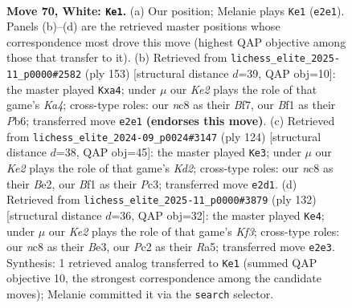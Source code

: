 \documentclass[11pt]{article}
\begin{document}
\clearpage

\begin{figure}[p]\centering
\begin{subfigure}{0.46\textwidth}\centering
\resizebox{\linewidth}{!}{%
\newchessgame
\chessboard[
  setfen={R1nk4/5r1p/P7/2P5/8/2p4P/2P1K1P1/5B2 w - - 3 70},
  showmover=false,
  pgfstyle=straightmove, color=movearrow, markmove={e2-e1}
]}
\caption{}
\end{subfigure}\hfill
\begin{subfigure}{0.46\textwidth}\centering
\resizebox{\linewidth}{!}{%
\newchessgame
\chessboard[
  setfen={8/4Rb2/1p5p/k7/P2K4/1p1N4/7r/8 b - - 1 77},
  showmover=false,
  pgfstyle=straightmove, color=movearrow, markmove={a5-a4}
]}
\caption{}
\end{subfigure}
\\[4pt]
\begin{subfigure}{0.46\textwidth}\centering
\resizebox{\linewidth}{!}{%
\newchessgame
\chessboard[
  setfen={2R5/8/3p3k/1n2p3/1P2P3/2P2P2/3KB1r1/8 w - - 5 63},
  showmover=false,
  pgfstyle=straightmove, color=movearrow, markmove={d2-e3}
]}
\caption{}
\end{subfigure}\hfill
\begin{subfigure}{0.46\textwidth}\centering
\resizebox{\linewidth}{!}{%
\newchessgame
\chessboard[
  setfen={8/3n3p/4kP2/R5P1/8/pr2BK1P/8/8 w - - 3 67},
  showmover=false,
  pgfstyle=straightmove, color=movearrow, markmove={f3-e4}
]}
\caption{}
\end{subfigure}
\caption{\textbf{Move 70, White: \texttt{Ke1}.} (a) Our position; Melanie plays \texttt{Ke1} (\texttt{e2e1}). Panels (b)--(d) are the retrieved master positions whose correspondence most drove this move (highest QAP objective among those that transfer to it). (b) Retrieved from \texttt{lichess\_elite\_2025-11\_p0000\#2582} (ply 153) [structural distance $d$=39, QAP obj=10]: the master played \texttt{Kxa4}; under $\mu$ our \emph{Ke2} plays the role of that game's \emph{Ka4}; cross-type roles: our \emph{n}c8 as their \emph{B}f7, our \emph{B}f1 as their \emph{P}b6; transferred move \texttt{e2e1} \textbf{(endorses this move)}. (c) Retrieved from \texttt{lichess\_elite\_2024-09\_p0024\#3147} (ply 124) [structural distance $d$=38, QAP obj=45]: the master played \texttt{Ke3}; under $\mu$ our \emph{Ke2} plays the role of that game's \emph{Kd2}; cross-type roles: our \emph{n}c8 as their \emph{B}e2, our \emph{B}f1 as their \emph{P}c3; transferred move \texttt{e2d1}. (d) Retrieved from \texttt{lichess\_elite\_2025-11\_p0000\#3879} (ply 132) [structural distance $d$=36, QAP obj=32]: the master played \texttt{Ke4}; under $\mu$ our \emph{Ke2} plays the role of that game's \emph{Kf3}; cross-type roles: our \emph{n}c8 as their \emph{B}e3, our \emph{P}c2 as their \emph{R}a5; transferred move \texttt{e2e3}. Synthesis: 1 retrieved analog transferred to \texttt{Ke1} (summed QAP objective 10, the strongest correspondence among the candidate moves); Melanie committed it via the \texttt{search} selector.}
\label{fig:thought-m138}
\end{figure}
\end{document}
